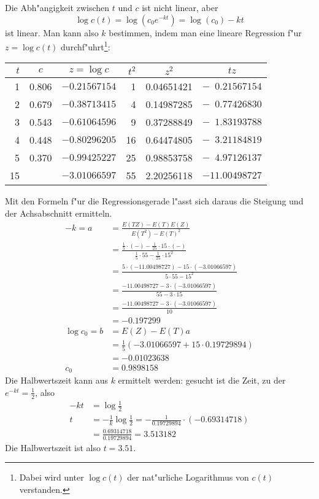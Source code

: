 \begin{loesung}
Die Abh"angigkeit zwischen $t$ und $c$ ist nicht linear, aber
\[
\log c(t)=\log(c_0e^{-kt})=\log(c_0)-kt
\]
ist linear. Man kann also $k$ bestimmen, indem man eine lineare
Regression f"ur $z=\log c(t)$ durchf"uhrt\footnote{Dabei wird
unter $\log c(t)$ der nat"urliche Logarithmus von $c(t)$
verstanden.}:
\begin{center}
\begin{tabular}{rccrcc}
$t$&$c$&$z=\log c$&$t^2$&$z^2$&$tz$\\
\hline
1&0.806&$-0.21567154$& 1&0.04651421&$-\phantom{0}0.21567154$\\
2&0.679&$-0.38713415$& 4&0.14987285&$-\phantom{0}0.77426830$\\
3&0.543&$-0.61064596$& 9&0.37288849&$-\phantom{0}1.83193788$\\
4&0.448&$-0.80296205$&16&0.64474805&$-\phantom{0}3.21184819$\\
5&0.370&$-0.99425227$&25&0.98853758&$-\phantom{0}4.97126137$\\
\hline
15&    &$-3.01066597$&55&2.20256118&$-11.00498727$\\
\end{tabular}
\end{center}
Mit den Formeln f"ur die Regressionsgerade l"asst sich daraus
die Steigung und der Achsabschnitt ermitteln.
\begin{align*}
-k=a&=\frac{E(TZ)-E(T)E(Z)}{E(T^2)-E(T)^2}
\\
&=\frac{\frac15\cdot(-)-\frac1{25}\cdot 15\cdot(-)}{
\frac15\cdot 55-\frac1{25}\cdot 15^2
}
\\
&=\frac{5\cdot(-11.00498727)- 15\cdot(-3.01066597)}{
5\cdot 55- 15^2
}
\\
&=\frac{-11.00498727- 3\cdot(-3.01066597)}{
55- 3\cdot 15
}
\\
&=\frac{-11.00498727- 3\cdot(-3.01066597)}{
10
}
\\
&=-0.197299
\\
\log c_0=b&=E(Z)-E(T)a
\\
&=\frac15(
-3.01066597+15 \cdot 0.19729894
)
\\
&=-0.01023638
\\
c_0&=0.9898158
\end{align*}
Die Halbwertszeit kann aus $k$ ermittelt werden: gesucht ist
die Zeit, zu der $e^{-kt}=\frac12$, also
\begin{align*}
-kt&=\log\frac12
\\
t&=-\frac1k\log\frac12=
-\frac1{0.19729894}\cdot(-0.69314718)
\\
&=\frac{0.69314718}{0.19729894}
=3.513182
\end{align*}
Die Halbwertszeit ist also $t=3.51$.


\end{loesung}
